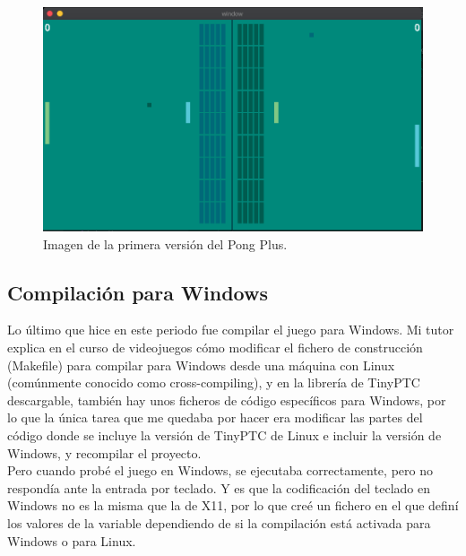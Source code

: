 \begin{figure}[h]
	\centering
	\includegraphics[width=15cm]{archivos/imagenes/pong-plus-con-minions-y-paredes.png}
	\caption{Imagen de la primera versión del Pong Plus.}
\end{figure}

\subsection{Compilación para Windows}
Lo último que hice en este periodo fue compilar el juego para Windows. Mi tutor explica en el curso de videojuegos \cite{CursoMotorC++} cómo modificar el fichero de construcción (Makefile) para compilar para Windows desde una máquina con Linux (comúnmente conocido como cross-compiling), y en la librería de TinyPTC descargable, también hay unos ficheros de código específicos para Windows, por lo que la única tarea que me quedaba por hacer era modificar las partes del código donde se incluye la versión de TinyPTC de Linux e incluir la versión de Windows, y recompilar el proyecto. 
\\
Pero cuando probé el juego en Windows, se ejecutaba correctamente, pero no respondía ante la entrada por teclado. Y es que la codificación del teclado en Windows no es la misma que la de X11, por lo que creé un fichero en el que definí los valores de la variable dependiendo de si la compilación está activada para Windows o para Linux.

